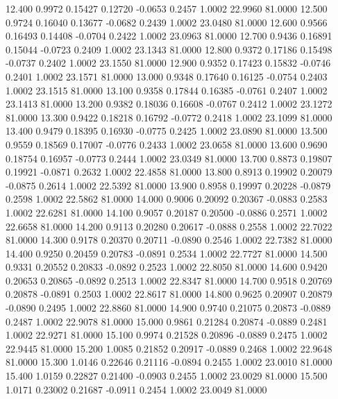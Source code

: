   12.400   0.9972   0.15427   0.12720  -0.0653   0.2457   1.0002  22.9960  81.0000
  12.500   0.9724   0.16040   0.13677  -0.0682   0.2439   1.0002  23.0480  81.0000
  12.600   0.9566   0.16493   0.14408  -0.0704   0.2422   1.0002  23.0963  81.0000
  12.700   0.9436   0.16891   0.15044  -0.0723   0.2409   1.0002  23.1343  81.0000
  12.800   0.9372   0.17186   0.15498  -0.0737   0.2402   1.0002  23.1550  81.0000
  12.900   0.9352   0.17423   0.15832  -0.0746   0.2401   1.0002  23.1571  81.0000
  13.000   0.9348   0.17640   0.16125  -0.0754   0.2403   1.0002  23.1515  81.0000
  13.100   0.9358   0.17844   0.16385  -0.0761   0.2407   1.0002  23.1413  81.0000
  13.200   0.9382   0.18036   0.16608  -0.0767   0.2412   1.0002  23.1272  81.0000
  13.300   0.9422   0.18218   0.16792  -0.0772   0.2418   1.0002  23.1099  81.0000
  13.400   0.9479   0.18395   0.16930  -0.0775   0.2425   1.0002  23.0890  81.0000
  13.500   0.9559   0.18569   0.17007  -0.0776   0.2433   1.0002  23.0658  81.0000
  13.600   0.9690   0.18754   0.16957  -0.0773   0.2444   1.0002  23.0349  81.0000
  13.700   0.8873   0.19807   0.19921  -0.0871   0.2632   1.0002  22.4858  81.0000
  13.800   0.8913   0.19902   0.20079  -0.0875   0.2614   1.0002  22.5392  81.0000
  13.900   0.8958   0.19997   0.20228  -0.0879   0.2598   1.0002  22.5862  81.0000
  14.000   0.9006   0.20092   0.20367  -0.0883   0.2583   1.0002  22.6281  81.0000
  14.100   0.9057   0.20187   0.20500  -0.0886   0.2571   1.0002  22.6658  81.0000
  14.200   0.9113   0.20280   0.20617  -0.0888   0.2558   1.0002  22.7022  81.0000
  14.300   0.9178   0.20370   0.20711  -0.0890   0.2546   1.0002  22.7382  81.0000
  14.400   0.9250   0.20459   0.20783  -0.0891   0.2534   1.0002  22.7727  81.0000
  14.500   0.9331   0.20552   0.20833  -0.0892   0.2523   1.0002  22.8050  81.0000
  14.600   0.9420   0.20653   0.20865  -0.0892   0.2513   1.0002  22.8347  81.0000
  14.700   0.9518   0.20769   0.20878  -0.0891   0.2503   1.0002  22.8617  81.0000
  14.800   0.9625   0.20907   0.20879  -0.0890   0.2495   1.0002  22.8860  81.0000
  14.900   0.9740   0.21075   0.20873  -0.0889   0.2487   1.0002  22.9078  81.0000
  15.000   0.9861   0.21284   0.20874  -0.0889   0.2481   1.0002  22.9271  81.0000
  15.100   0.9974   0.21528   0.20896  -0.0889   0.2475   1.0002  22.9445  81.0000
  15.200   1.0085   0.21852   0.20917  -0.0889   0.2468   1.0002  22.9648  81.0000
  15.300   1.0146   0.22646   0.21116  -0.0894   0.2455   1.0002  23.0010  81.0000
  15.400   1.0159   0.22827   0.21400  -0.0903   0.2455   1.0002  23.0029  81.0000
  15.500   1.0171   0.23002   0.21687  -0.0911   0.2454   1.0002  23.0049  81.0000
